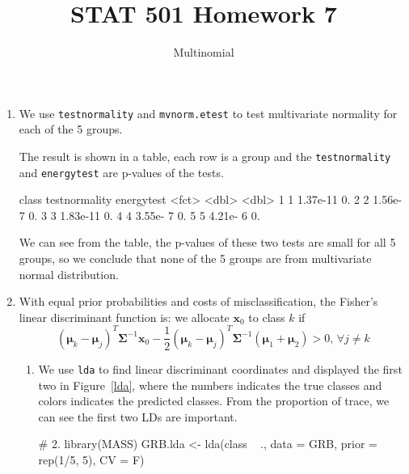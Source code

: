 \documentclass{article}
\begin{document}
	

	
	\title{STAT 501 Homework 7
	}
	\author{Multinomial}
	\maketitle
	
	\begin{enumerate}[leftmargin = 0 em, label = \arabic*., font = \bfseries]
	\item
	We use \verb|testnormality| and \verb|mvnorm.etest| to test multivariate normality for each of the 5 groups.
	The result is shown in a table, each row is a group and the \verb|testnormality| and \verb|energytest| are p-values of the tests.
\begin{rcode}
  class testnormality energytest
  <fct>         <dbl>      <dbl>
1 1          1.37e-11         0.
2 2          1.56e- 7         0.
3 3          1.83e-11         0.
4 4          3.55e- 7         0.
5 5          4.21e- 6         0.
\end{rcode}
We can see from the table, the p-values of these two tests are small for all 5 groups, so we conclude that none of the 5 groups are from multivariate normal distribution.

\item 
With equal prior probabilities and costs of misclassification, the Fisher's linear discriminant function is: we allocate $\bm x_0$ to class $k$ if 
\[(\bm \mu_k - \bm \mu_j)^T \bm \Sigma^{-1} \bm x_0 - \frac{1}{2} (\bm \mu_k - \bm \mu_j)^T \bm \Sigma^{-1} (\bm \mu_1 + \bm \mu_2) > 0,\, \forall j \neq k\]
\begin{enumerate}
	\item 
	We use \verb|lda| to find linear discriminant coordinates and displayed the first two in Figure~\ref{lda}, where the numbers indicates the true classes and colors indicates the predicted classes. From the proportion of trace, we can see the first two LDs are important.
	\begin{rcode}
# 2.
library(MASS)
GRB.lda <- lda(class ~ ., data = GRB, prior = rep(1/5, 5), CV = F)


\end{rcode}
\end{enumerate}
\end{enumerate}
\end{document}
